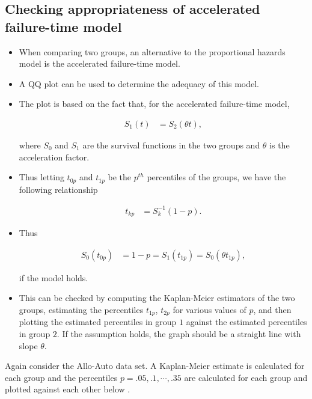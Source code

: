 \documentclass[10pt]{article}\usepackage[]{graphicx}\usepackage[]{xcolor}
\theoremstyle{definition}
\numberwithin{equation}{subsection}
\numberwithin{figure}{section}
\numberwithin{table}{subsection}
\numberwithin{Report}{section}
\numberwithin{Example}{subsection}
\begin{document}
\subsection{Checking appropriateness of accelerated failure-time model}
\begin{itemize}
\item When comparing two groups, an alternative to the proportional hazards model is the accelerated failure-time model.
\item A QQ plot can be used to determine the adequacy of this model.
\item The plot is based on the fact that, for the accelerated failure-time model,

\begin{align*}
S_{1}(t) & =S_{2}(\theta t),
\end{align*}

where $S_{0}$ and $S_{1}$ are the survival functions in the two
groups and $\theta$ is the acceleration factor.

\item Thus letting $t_{0p}$ and $t_{1p}$ be the $p^{th}$ percentiles
of the groups, we have the following relationship


\begin{align*}
t_{kp} & =S_{k}^{-1}(1-p).
\end{align*}


\item Thus 


\begin{align*}
S_{0}(t_{0p}) & =1-p=S_{1}(t_{1p})=S_{0}(\theta t_{1p}),
\end{align*}



if the model holds.

\item This can be checked by computing the Kaplan-Meier estimators of the
two groups, estimating the percentiles $t_{1p}$, $t_{2p}$ for various
values of $p$, and then plotting the estimated percentiles in group
$1$ against the estimated percentiles in group $2$. If the assumption
holds, the graph should be a straight line with slope $\theta$.\end{itemize}


\noindent Again consider the Allo-Auto data set. A Kaplan-Meier estimate
is calculated for each group and the percentiles $p=.05,.1,\cdots,.35$
are calculated for each group and plotted against each other below
.
\end{document}
